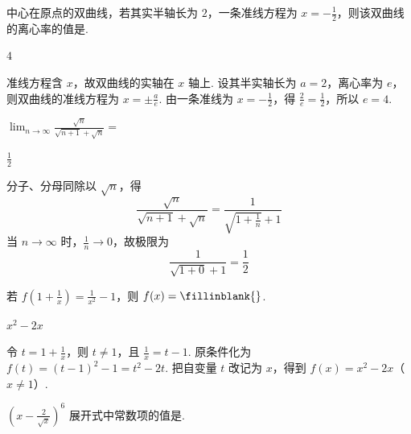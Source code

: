 \documentclass[UTF8,a4paper,oneside,11pt]{ctexbook}
\begin{document}
\begin{problem}

中心在原点的双曲线，若其实半轴长为 \(2\)，一条准线方程为 \(x = -\frac{1}{2}\)，则该双曲线的离心率的值是\fillinblank{}.
\end{problem}

\begin{answer}
\(4\)
\end{answer}

\begin{solution}
准线方程含 \(x\)，故双曲线的实轴在 \(x\) 轴上. 设其半实轴长为 \(a=2\)，离心率为 \(e\)，则双曲线的准线方程为 \(x=\pm\frac{a}{e}\). 由一条准线为 \(x=-\frac{1}{2}\)，得 \(\frac{2}{e}=\frac{1}{2}\)，所以 \(e=4\).
\end{solution}


\begin{problem}
\(\displaystyle\lim_{n\to \infty}\frac{\sqrt{n}}{\sqrt{n + 1} + \sqrt{n}} =\)\fillinblank{}
\end{problem}

\begin{answer}
\(\frac{1}{2}\)
\end{answer}

\begin{solution}
分子、分母同除以 \(\sqrt n\)，得
\[
\frac{\sqrt n}{\sqrt{n+1}+\sqrt n}
=\frac{1}{\sqrt{1+\frac{1}{n}}+1}
\]
当 \(n\to\infty\) 时，\(\frac{1}{n}\to0\)，故极限为
\[
\frac{1}{\sqrt{1+0}+1}=\frac{1}{2}
\]
\end{solution}


\begin{problem}

若 \(f\left(1 + \frac{1}{x}\right) = \frac{1}{x^2} - 1 \)，则 \(f(x) =\fillinblank{}\).
\end{problem}

\begin{answer}
\(x^{2} - 2x\)
\end{answer}

\begin{solution}
令 \(t=1+\frac{1}{x}\)，则 \(t\ne1\)，且 \(\frac{1}{x}=t-1\). 原条件化为 \(f(t)=(t-1)^2-1=t^2-2t\). 把自变量 \(t\) 改记为 \(x\)，得到 \(f(x)=x^2-2x\)（\(x\ne1\)）.
\end{solution}


\begin{problem}

\(\left(x - \frac{2}{\sqrt{x}}\right)^6\) 展开式中常数项的值是\fillinblank{}.
\end{problem}
\end{document}
